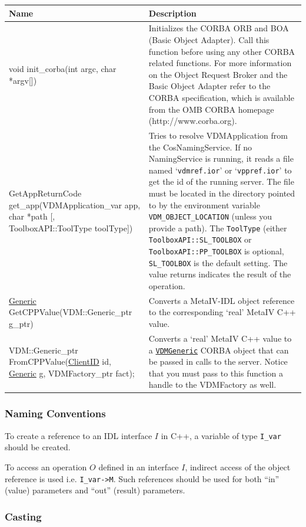 \documentclass[\pformat,12pt]{article}
\newcommand{\pbs}[1]{\let\temp=\\#1\let\\=\temp}
\newenvironment{interfacetable}{%
  \begin{longtable}{|>{\pbs\raggedright\ttfamily}p{6.6cm}%
                    |>{\pbs\raggedright}p{6.6cm}|} \hline
  \textrm{\bfseries Name} &  \textbf{Description} \\ \hline
  \endhead
  }{\end{longtable}}
\newcommand{\Generic}{\hyperlink{interface.Generic}{Generic}}
\newcommand{\VDMGeneric}{\hyperlink{interface.Generic}{VDMGeneric}}
\newcommand{\ClientID}{\hyperlink{type.ClientID}{ClientID}}
\begin{document}
\begin{interfacetable}
void init\_corba(int argc, char *argv[])
  & Initializes the CORBA ORB and BOA (Basic Object Adapter). 
    Call this function before using any other CORBA related functions.
    For more information on the Object Request Broker and the Basic
    Object Adapter refer to the CORBA specification, which is available
    from the OMB CORBA homepage (http://www.corba.org).
\\ \hline
\hyperdef{cppclient}{GetAppReturnCode}
GetAppReturnCode get\_app(VDMApplication\_var app, char *path [, ToolboxAPI::ToolType toolType])
  & Tries to resolve VDMApplication from the CosNamingService.
    If no NamingService is running, it
    reads a file named `{\tt vdmref.ior}' or `{\tt vppref.ior}' to get the id of the running
    server. The file must be located in the directory pointed to by the
    environment variable \texttt{VDM\_OBJECT\_LOCATION} (unless you provide
    a path). The {\tt ToolType}
    (either {\tt ToolboxAPI::SL\_TOOLBOX} or {\tt ToolboxAPI::PP\_TOOLBOX} is
    optional, {\tt SL\_TOOLBOX} is the default setting.
    The value returns indicates the result of the operation.
\\ \hline
{\Generic} GetCPPValue(VDM::Generic\_ptr g\_ptr)
  &  Converts a MetaIV-IDL object reference to the
     corresponding `real' MetaIV C++ value.
\\ \hline
VDM::Generic\_ptr FromCPPValue({\ClientID} id, {\Generic} g, VDMFactory\_ptr fact);
  &  Converts a `real' MetaIV C++ value to a \texttt{\VDMGeneric}
     CORBA object that can be passed in calls to the server. Notice
     that you must pass to this function a handle to the VDMFactory as
     well. 
\\ \hline
\end{interfacetable}

\subsubsection{Naming Conventions}

To create a reference to an IDL interface $I$ in C++, a variable of
type \texttt{I\_var} should be created. 

To access an operation $O$ defined in an interface $I$, indirect
access of the object reference is used i.e. \texttt{I\_var->M}. Such
references should be used for both ``in'' (value) parameters and
``out'' (result) parameters.

\subsubsection{Casting}
\end{document}
